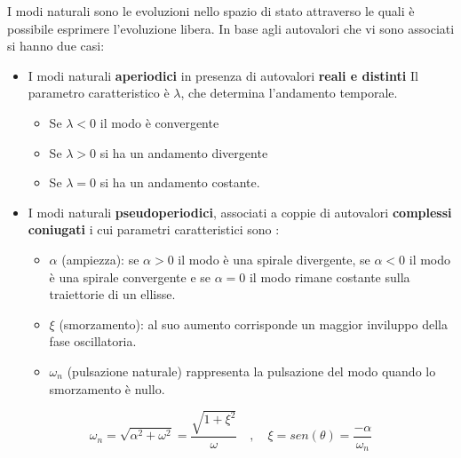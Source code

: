 \documentclass{article}
\begin{document}
I modi naturali sono le evoluzioni nello spazio di stato attraverso le quali è possibile esprimere l'evoluzione libera.
In base agli autovalori che vi sono associati si hanno due casi:\\
\begin{itemize}
    \item I modi naturali \textbf{aperiodici} in presenza di autovalori \textbf{reali e distinti}
    Il parametro caratteristico è $\lambda$, che determina l'andamento temporale.
    \begin{itemize}
        \item   Se $\lambda<0$ il modo è convergente
        \item   Se $\lambda>0$ si ha un andamento divergente
        \item   Se $\lambda=0$ si ha un andamento costante.
    \end{itemize}
    \item I modi naturali \textbf{pseudoperiodici}, associati a coppie di autovalori \textbf{complessi coniugati}
    i cui parametri caratteristici sono :
    \begin{itemize}
        \item $\alpha$ (ampiezza): se $\alpha>0$ il modo è una spirale divergente,
        se $\alpha<0$ il modo è una spirale convergente
        e se $\alpha=0$ il modo rimane costante sulla traiettorie di un ellisse.
    \item $\xi$ (smorzamento): al suo aumento  corrisponde un maggior inviluppo della fase oscillatoria.
    \item $\omega_n$ (pulsazione naturale) rappresenta la pulsazione del modo quando lo smorzamento è nullo.
    \end{itemize}
\end{itemize}
\[ \omega_n=\sqrt{\alpha^2+\omega^2}=\frac{\sqrt{1+\xi^2}}{\omega}\quad , \quad \xi=sen(\theta)=\frac{-\alpha}{\omega_n} \]
\end{document}

